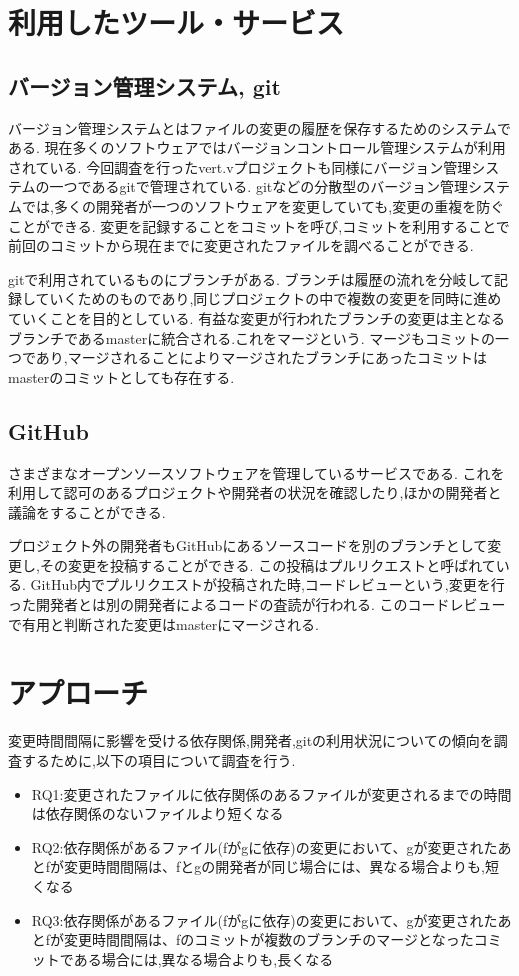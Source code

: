 \documentclass{fose2016}           %
\begin{document}
\section{利用したツール・サービス}\label{ツール・サービス}
\subsection{バージョン管理システム, git}
バージョン管理システムとはファイルの変更の履歴を保存するためのシステムである.
現在多くのソフトウェアではバージョンコントロール管理システムが利用されている.
今回調査を行ったvert.vプロジェクトも同様にバージョン管理システムの一つであるgitで管理されている.
gitなどの分散型のバージョン管理システムでは,多くの開発者が一つのソフトウェアを変更していても,変更の重複を防ぐことができる.
変更を記録することをコミットを呼び,コミットを利用することで前回のコミットから現在までに変更されたファイルを調べることができる.

gitで利用されているものにブランチがある.
ブランチは履歴の流れを分岐して記録していくためのものであり,同じプロジェクトの中で複数の変更を同時に進めていくことを目的としている.
有益な変更が行われたブランチの変更は主となるブランチであるmasterに統合される.これをマージという.
マージもコミットの一つであり,マージされることによりマージされたブランチにあったコミットはmasterのコミットとしても存在する.

\subsection{GitHub}
さまざまなオープンソースソフトウェアを管理しているサービスである.
これを利用して認可のあるプロジェクトや開発者の状況を確認したり,ほかの開発者と議論をすることができる.

プロジェクト外の開発者もGitHubにあるソースコードを別のブランチとして変更し,その変更を投稿することができる.
この投稿はプルリクエストと呼ばれている.
GitHub内でプルリクエストが投稿された時,コードレビューという,変更を行った開発者とは別の開発者によるコードの査読が行われる.
このコードレビューで有用と判断された変更はmasterにマージされる.


\section{アプローチ}\label{アプローチ}
変更時間間隔に影響を受ける依存関係,開発者,gitの利用状況についての傾向を調査するために,以下の項目について調査を行う.
\begin{itemize}
\item RQ1:変更されたファイルに依存関係のあるファイルが変更されるまでの時間は依存関係のないファイルより短くなる
\item RQ2:依存関係があるファイル(fがgに依存)の変更において、gが変更されたあとfが変更時間間隔は、fとgの開発者が同じ場合には、異なる場合よりも,短くなる
\item RQ3:依存関係があるファイル(fがgに依存)の変更において、gが変更されたあとfが変更時間間隔は、fのコミットが複数のブランチのマージとなったコミットである場合には,異なる場合よりも,長くなる
\end{itemize}
\end{document}
